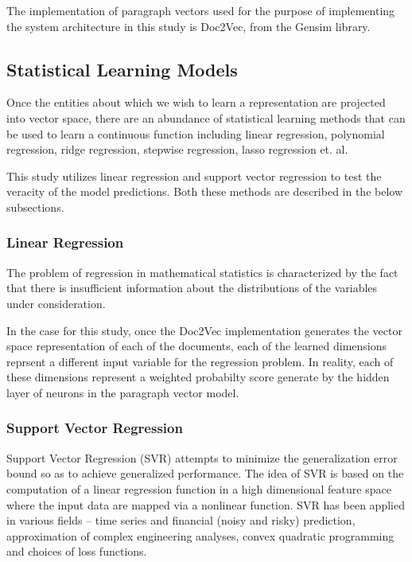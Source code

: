 \documentclass[conference]{IEEEtran}
\begin{document}
        The implementation of paragraph vectors used for the purpose of implementing the system architecture in this study is Doc2Vec, from the Gensim library\cite{doc2vec_api}.


    \subsection{Statistical Learning Models}
        Once the entities about which we wish to learn a representation are projected into vector space, there are an abundance of statistical learning methods that can be used to learn a continuous function including linear regression, polynomial regression, ridge regression, stepwise regression, lasso regression et. al.

        This study utilizes linear regression and support vector regression to test the veracity of the model predictions. Both these methods are described in the below subsections.

    \subsubsection{Linear Regression}
        The problem of regression in mathematical statistics is characterized by the fact that there is insufficient information about the distributions of the variables under consideration\cite{regression_analysis}.

        In the case for this study, once the Doc2Vec implementation generates the vector space representation of each of the documents, each of the learned dimensions reprsent a different input variable for the regression problem. In reality, each of these dimensions represent a weighted probabilty score generate by the hidden layer of neurons in the paragraph vector model.

    \subsubsection{Support Vector Regression}
        Support Vector Regression (SVR) attempts to minimize the generalization error bound so as to achieve generalized performance. The idea of SVR is based on the computation of a linear regression function in a high dimensional feature space where the input data are mapped via a nonlinear function. SVR has been applied in various fields – time series and financial (noisy and risky) prediction, approximation of complex engineering analyses, convex quadratic programming and choices of loss functions\cite{basak2007support}.
\end{document}
